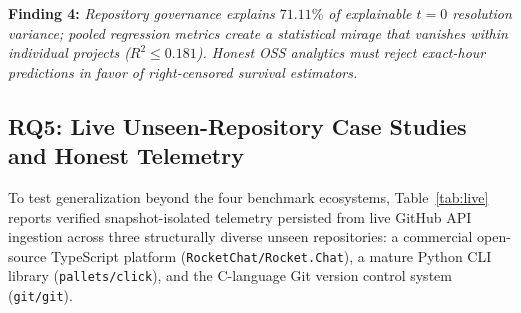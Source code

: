 \documentclass[conference]{IEEEtran}
\begin{document}
\textbf{Finding 4:} \emph{Repository governance explains $71.11\%$ of explainable $t=0$ resolution variance; pooled regression metrics create a statistical mirage that vanishes within individual projects ($R^2 \le 0.181$). Honest OSS analytics must reject exact-hour predictions in favor of right-censored survival estimators.}

\subsection{RQ5: Live Unseen-Repository Case Studies and Honest Telemetry}
\label{sec:results_live}

To test generalization beyond the four benchmark ecosystems, Table~\ref{tab:live} reports verified snapshot-isolated telemetry persisted from live GitHub API ingestion across three structurally diverse unseen repositories: a commercial open-source TypeScript platform (\texttt{RocketChat/Rocket.Chat}), a mature Python CLI library (\texttt{pallets/click}), and the C-language Git version control system (\texttt{git/git}).

\begin{table}[t]
\centering
\caption{Live Unseen-Repository Telemetry Under Rate-Budgeted Ingestion and Confidence Accounting (\texttt{v2026.2})}
\label{tab:live}
\setlength{\tabcolsep}{4.0pt}
\end{table}
\end{document}
